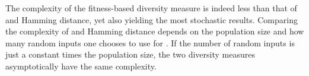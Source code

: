 The complexity of the fitness-based diversity measure is indeed less than that of \dia{} and Hamming distance, yet also yielding the most stochastic results. Comparing the complexity of \dia{} and Hamming distance depends on the population size and how many random inputs one chooses to use for \dia{}. If the number of random inputs is just a constant times the population size, the two diversity measures asymptotically have the same complexity.
